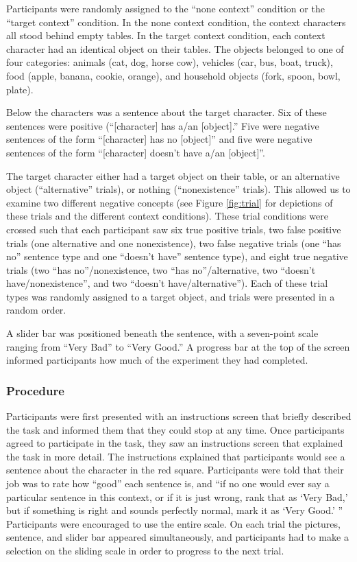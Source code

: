 \documentclass[10pt,letterpaper]{article}
\begin{document}
Participants were randomly assigned to the ``none context'' condition or the ``target context'' condition.  In the none context condition, the context characters all stood behind empty tables.  In the target context condition, each context character had an identical object on their tables.  The objects belonged to one of four categories: animals (cat, dog, horse cow), vehicles (car, bus, boat, truck), food (apple, banana, cookie, orange), and household objects (fork, spoon, bowl, plate).  

Below the characters was a sentence about the target character.  Six of these sentences were positive (``[character] has a/an [object].''  Five were negative sentences of the form ``[character] has no [object]'' and five were negative sentences of the form ``[character] doesn't have a/an [object]''.  

The target character either had a target object on their table, or an alternative object (``alternative'' trials), or nothing (``nonexistence'' trials).  This allowed us to examine two different negative concepts (see Figure \ref{fig:trial}  for depictions of these trials and the different context conditions).    These trial conditions were crossed such that each participant saw six true positive trials, two false positive trials (one alternative and one nonexistence), two false negative trials (one ``has no'' sentence type and one ``doesn't have'' sentence type), and eight true negative trials (two ``has no''/nonexistence, two ``has no''/alternative, two ``doesn't have/nonexistence'', and two ``doesn't have/alternative'').  Each of these trial types was randomly assigned to a target object, and trials were presented in a random order.  

A slider bar was positioned beneath the sentence, with a seven-point scale ranging from ``Very Bad'' to ``Very Good.''  A progress bar at the top of the screen informed participants how much of the experiment they had completed. 

\subsubsection{Procedure}

Participants were first presented with an instructions screen that briefly described the task and informed them that they could stop at any time.  Once participants agreed to participate in the task, they saw an instructions screen that explained the task in more detail.  The instructions explained that participants would see a sentence about the character in the red square.  Participants were told that their job was to rate how ``good'' each sentence is, and ``if no one would ever say a particular sentence in this context, or if it is just wrong, rank that as `Very Bad,' but if something is right and sounds perfectly normal, mark it as `Very Good.' ''  Participants were encouraged to use the entire scale. On each trial the pictures, sentence, and slider bar appeared simultaneously, and participants had to make a selection on the sliding scale in order to progress to the next trial.  
\end{document}
